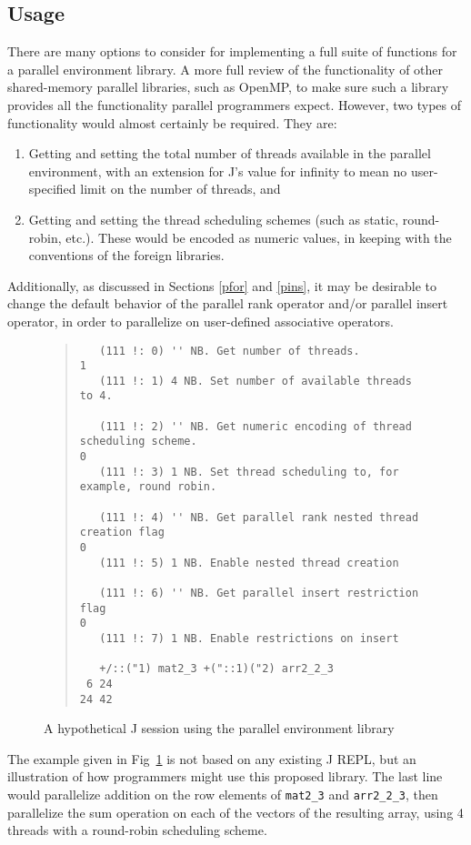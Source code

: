 \subsection{Usage}
There are many options to consider for implementing a full suite of functions for a parallel environment library.
A more full review of the functionality of other shared-memory parallel libraries, such as OpenMP\cite{openmp}, 
to make sure such a library provides all the functionality parallel programmers expect.
However, two types of functionality would almost certainly be required.
They are:

\begin{enumerate}
    \item Getting and setting the total number of threads available in the parallel environment,
        with an extension for J's value for infinity to mean no user-specified limit on the number of threads, and
    \item Getting and setting the thread scheduling schemes (such as static, round-robin, etc.).
        These would be encoded as numeric values, in keeping with the conventions of the foreign libraries.
\end{enumerate}

\noindent Additionally, as discussed in Sections \ref{pfor} and \ref{pins}, it may be desirable to change 
the default behavior of the parallel rank operator and/or parallel insert operator, 
in order to parallelize on user-defined associative operators.

\begin{figure}
\begin{quote}
\begin{singlespacing}
\begin{small}
\begin{verbatim}
   (111 !: 0) '' NB. Get number of threads.
1
   (111 !: 1) 4 NB. Set number of available threads to 4.

   (111 !: 2) '' NB. Get numeric encoding of thread scheduling scheme.
0
   (111 !: 3) 1 NB. Set thread scheduling to, for example, round robin.

   (111 !: 4) '' NB. Get parallel rank nested thread creation flag
0
   (111 !: 5) 1 NB. Enable nested thread creation

   (111 !: 6) '' NB. Get parallel insert restriction flag
0
   (111 !: 7) 1 NB. Enable restrictions on insert

   +/::("1) mat2_3 +("::1)("2) arr2_2_3
 6 24
24 42
\end{verbatim}
\end{small}
\end{singlespacing}
\end{quote}
\caption{A hypothetical J session using the parallel environment library}
\label{fig::pfor}
\end{figure}

The example given in Fig~\ref{fig::pfor} is not based on any existing J REPL, 
but an illustration of how programmers might use this proposed library.
The last line would parallelize addition on the row elements of \texttt{mat2\_3} and \texttt{arr2\_2\_3},
then parallelize the sum operation on each of the vectors of the resulting array, 
using 4 threads with a round-robin scheduling scheme.
